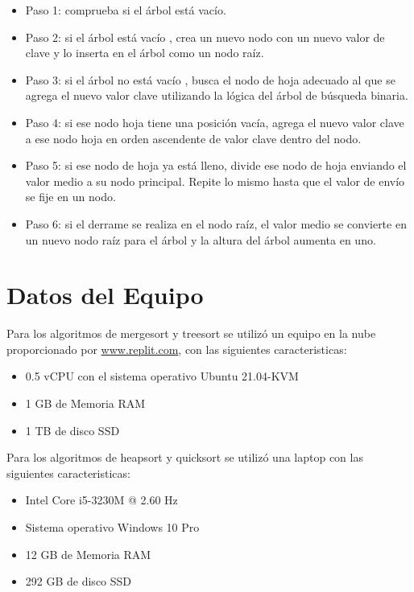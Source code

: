 \documentclass{article}
\begin{document}
\begin{enumerate}
		
\begin{itemize}
\item Paso 1: comprueba si el árbol está vacío.
 \item Paso 2: si el árbol está vacío , crea un nuevo nodo con un nuevo valor de clave y lo inserta en el árbol como un nodo raíz.
\item Paso 3: si el árbol no está vacío , busca el nodo de hoja adecuado al que se agrega el nuevo valor clave utilizando la lógica del árbol de búsqueda binaria.
\item Paso 4: si ese nodo hoja tiene una posición vacía, agrega el nuevo valor clave a ese nodo hoja en orden ascendente de valor clave dentro del nodo.
\item Paso 5: si ese nodo de hoja ya está lleno, divide ese nodo de hoja enviando el valor medio a su nodo principal. Repite lo mismo hasta que el valor de envío se fije en un nodo.
\item Paso 6: si el derrame se realiza en el nodo raíz, el valor medio se convierte en un nuevo nodo raíz para el árbol y la altura del árbol aumenta en uno.
\end{itemize}
\end{enumerate}
    \section{Datos del Equipo}
    Para los algoritmos de mergesort y treesort se utilizó un equipo en la nube proporcionado por \href{https://replit.com/~}{www.replit.com}, con las siguientes caracteristicas:

    \begin{itemize}
        \item 0.5 vCPU con el sistema operativo Ubuntu 21.04-KVM
        \item 1 GB de Memoria RAM
        \item 1 TB de disco SSD
    \end{itemize}

	Para los algoritmos de heapsort y quicksort se utilizó una laptop con las siguientes caracteristicas:
	
	\begin{itemize}
		\item Intel Core i5-3230M @ 2.60 Hz
		\item Sistema operativo Windows 10 Pro
		\item 12 GB de Memoria RAM
		\item 292 GB de disco SSD
	\end{itemize}
\end{document}
